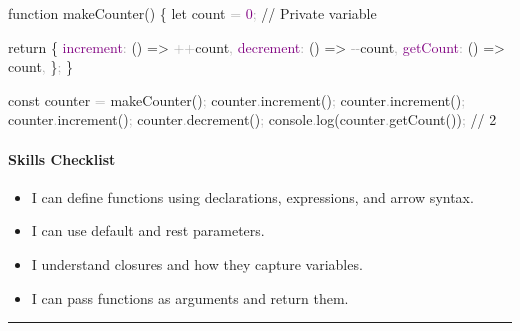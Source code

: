 \documentclass[
  justified,
  openright,
]{tufte-book}
\let\subsubsection\paragraph
\let\paragraph\paragraph
\newcommand{\BuiltInTok}[1]{#1}
\newcommand{\CommentTok}[1]{\textcolor{MidGray}{#1}}
\newcommand{\ControlFlowTok}[1]{\textcolor{BrandBlue}{#1}}
\newcommand{\DataTypeTok}[1]{\textcolor{Purple}{#1}}
\newcommand{\DecValTok}[1]{\textcolor{Purple}{#1}}
\newcommand{\FunctionTok}[1]{\textcolor{BrandBlue}{#1}}
\newcommand{\KeywordTok}[1]{\textcolor{BrandBlue}{#1}}
\newcommand{\NormalTok}[1]{#1}
\newcommand{\OperatorTok}[1]{\textcolor{DarkGray}{#1}}
\newenvironment{Shaded}{%
  \begin{snugshade}
}{%
  \end{snugshade}
}
\let\subsubsection\paragraph
\let\paragraph\paragraph
\providecommand{\tightlist}{%
  \setlength{\itemsep}{0pt}\setlength{\parskip}{0pt}}
\begin{document}
\begin{Shaded}
\begin{Highlighting}[]
\KeywordTok{function} \FunctionTok{makeCounter}\NormalTok{() \{}
  \KeywordTok{let}\NormalTok{ count }\OperatorTok{=} \DecValTok{0}\OperatorTok{;} \CommentTok{// Private variable}

  \ControlFlowTok{return}\NormalTok{ \{}
    \DataTypeTok{increment}\OperatorTok{:}\NormalTok{ () }\KeywordTok{=\textgreater{}} \OperatorTok{++}\NormalTok{count}\OperatorTok{,}
    \DataTypeTok{decrement}\OperatorTok{:}\NormalTok{ () }\KeywordTok{=\textgreater{}} \OperatorTok{{-}{-}}\NormalTok{count}\OperatorTok{,}
    \DataTypeTok{getCount}\OperatorTok{:}\NormalTok{ () }\KeywordTok{=\textgreater{}}\NormalTok{ count}\OperatorTok{,}
\NormalTok{  \}}\OperatorTok{;}
\NormalTok{\}}

\KeywordTok{const}\NormalTok{ counter }\OperatorTok{=} \FunctionTok{makeCounter}\NormalTok{()}\OperatorTok{;}
\NormalTok{counter}\OperatorTok{.}\FunctionTok{increment}\NormalTok{()}\OperatorTok{;}
\NormalTok{counter}\OperatorTok{.}\FunctionTok{increment}\NormalTok{()}\OperatorTok{;}
\NormalTok{counter}\OperatorTok{.}\FunctionTok{increment}\NormalTok{()}\OperatorTok{;}
\NormalTok{counter}\OperatorTok{.}\FunctionTok{decrement}\NormalTok{()}\OperatorTok{;}
\BuiltInTok{console}\OperatorTok{.}\FunctionTok{log}\NormalTok{(counter}\OperatorTok{.}\FunctionTok{getCount}\NormalTok{())}\OperatorTok{;} \CommentTok{// 2}
\end{Highlighting}
\end{Shaded}

\subsubsection{Skills Checklist}\label{skills-checklist-11}

\begin{itemize}
\tightlist
\item[$\square$]
  I can define functions using declarations, expressions, and arrow
  syntax.
\item[$\square$]
  I can use default and rest parameters.
\item[$\square$]
  I understand closures and how they capture variables.
\item[$\square$]
  I can pass functions as arguments and return them.
\end{itemize}

\begin{center}\rule{0.5\linewidth}{0.5pt}\end{center}
\end{document}
